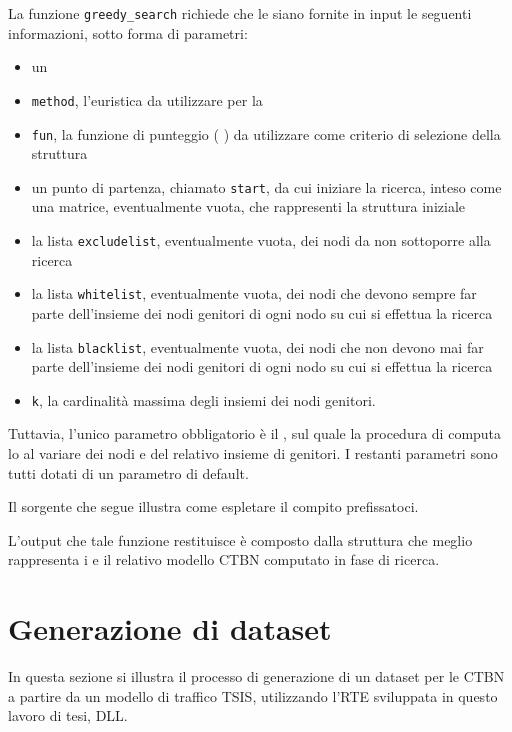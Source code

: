 La funzione \lstinline[language=rstats]{greedy_search} richiede che le siano fornite in input le seguenti informazioni, sotto forma di parametri:
\begin{itemize}
	\item un \emph{}
	\item \lstinline$method$, l'euristica da utilizzare per la 
	\item \lstinline$fun$, la funzione di punteggio (\ie{} \emph{}) da utilizzare come criterio di selezione della struttura
	\item un punto di partenza, chiamato \lstinline$start$, da cui iniziare la ricerca, inteso come una matrice, eventualmente vuota, che rappresenti la struttura iniziale
	\item la lista \lstinline$excludelist$, eventualmente vuota, dei nodi da non sottoporre alla ricerca
	\item la lista \lstinline$whitelist$, eventualmente vuota, dei nodi che devono sempre far parte dell'insieme dei nodi genitori di ogni nodo su cui si effettua la ricerca
	\item la lista \lstinline$blacklist$, eventualmente vuota, dei nodi che non devono mai far parte dell'insieme dei nodi genitori di ogni nodo su cui si effettua la ricerca
	\item \lstinline$k$, la cardinalità massima degli insiemi dei nodi genitori.
\end{itemize}
Tuttavia, l'unico parametro obbligatorio è il \emph{}, sul quale la procedura di  computa lo \emph{} al variare dei nodi e del relativo insieme di genitori. I restanti parametri sono tutti dotati di un parametro di default.

Il sorgente che segue illustra come espletare il compito prefissatoci.

\vspace*{8pt}

L'output che tale funzione restituisce è composto dalla struttura che meglio rappresenta i  e il relativo modello \acs{CTBN} computato in fase di ricerca.

\section{Generazione di dataset}\label{sec:create-dataset-howto}
In questa sezione si illustra il processo di generazione di un dataset per le \acs{CTBN} a partire da un modello di traffico \acs{TSIS}, utilizzando l'\acl{RTE} sviluppata in questo lavoro di tesi,  \acs{DLL}.

